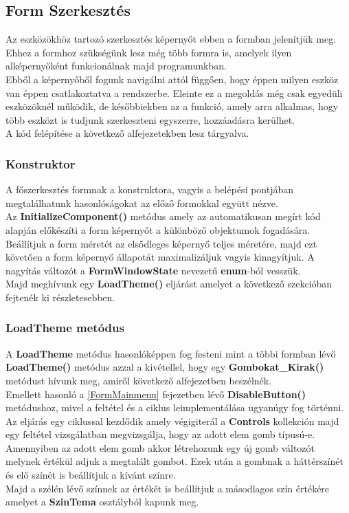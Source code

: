 \documentclass[tocnopagenum]{thesis-ekf}
\theoremstyle{definition}
\theoremstyle{remark}
\begin{document}
	
	\subsection{Form Szerkesztés}
	\label{Form Szerkesztes}
	Az eszközökhöz tartozó szerkesztés képernyőt ebben a formban jelenítjük meg. Ehhez a formhoz szükségünk lesz még több formra is, amelyek ilyen alképernyőként funkcionálnak majd programunkban.
	\\
	Ebből a képernyőből fogunk navigálni attól függően, hogy éppen milyen eszköz van éppen csatlakoztatva a rendszerbe. Eleinte ez a megoldás még csak egyedüli eszközöknél működik, de későbbiekben az a funkció, amely arra alkalmas, hogy több eszközt is tudjunk szerkeszteni egyszerre, hozzáadásra kerülhet.
	\\
	A kód felépítése a következő alfejezetekben lesz tárgyalva.
	\subsubsection{Konstruktor}
	A főszerkesztés formnak a konstruktora, vagyis a belépési pontjában megtalálhatunk hasonlóságokat az előző formokkal együtt nézve.
	\\
	Az \textbf{InitializeComponent()} metódus amely az automatikusan megírt kód alapján előkészíti a form képernyőt a különböző objektumok fogadására. Beállítjuk a form méretét az elsődleges képernyő teljes méretére, majd ezt követően a form képernyő állapotát maximalizáljuk vagyis kinagyítjuk. A nagyítás változót a \textbf{FormWindowState} nevezetű \textbf{enum}-ból vesszük.
	\\
	Majd meghívunk egy \textbf{LoadTheme()} eljárást amelyet a következő szekcióban fejtenék ki részletesebben. 
	\subsubsection{LoadTheme metódus}
	A \textbf{LoadTheme} metódus hasonlóképpen fog festeni mint a többi formban lévő \textbf{LoadTheme()} metódus azzal a kivétellel, hogy egy \textbf{Gombokat\_Kirak()} metódust hívunk meg, amiről következő alfejezetben beszélnék.
	\\
	Emellett hasonló a \ref{FormMainmenu} fejezetben lévő \textbf{DisableButton()} metódushoz, mivel a feltétel és a ciklus leimplementálása ugyanúgy fog történni. 
	\\
	Az eljárás egy ciklussal kezdődik amely végigiterál a \textbf{Controls} kollekción majd egy feltétel vizsgálatban megvizsgálja, hogy az adott elem gomb típusú-e. Amennyiben az adott elem gomb akkor létrehozunk egy új gomb változót melynek értékül adjuk a megtalált gombot. Ezek után a gombnak a háttérszínét és elő színét is beállítjuk a kívánt színre. 
	\\
	Majd a szélén lévő színnek az értékét is beállítjuk a másodlagos szín értékére amelyet a \textbf{SzinTema} osztályból kapunk meg.
\end{document}
